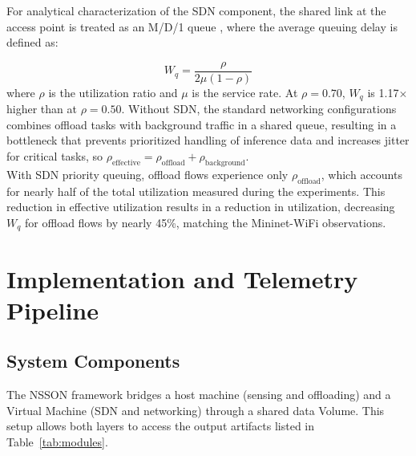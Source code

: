 \documentclass[journal]{IEEEtran}
\begin{document}
For analytical characterization of the SDN component, the shared link at the access point is treated as an M/D/1 queue \cite{mancuso2026mind}, where the average queuing delay is defined as:

\begin{equation}
W_q = \frac{\rho}{2\mu(1-\rho)}
\label{eq:queue}
\end{equation}
where $\rho$ is the utilization ratio and $\mu$ is the service rate.
At $\rho = 0.70$, $W_q$ is 1.17$\times$ higher than at $\rho = 0.50$.
Without SDN, the standard networking configurations combines offload tasks with background traffic in a shared queue, resulting in a bottleneck that prevents prioritized handling of inference data and increases jitter for critical tasks, so
$\rho_{\text{effective}} = \rho_{\text{offload}} + \rho_{\text{background}}$.
\\ With SDN priority queuing, offload flows experience only $\rho_{\text{offload}}$,
which accounts for nearly half of the total utilization measured during the experiments. This reduction in effective utilization results in a reduction in utilization, decreasing $W_q$ for offload flows by nearly 45\%, matching the Mininet-WiFi observations.

\section{Implementation and Telemetry Pipeline}
\label{sec:implementation}

\subsection{System Components}
The NSSON framework bridges a host machine (sensing and offloading) and a Virtual Machine (SDN and networking) through a shared data Volume. This setup allows both layers to access the output artifacts listed in Table~\ref{tab:modules}.
\end{document}
